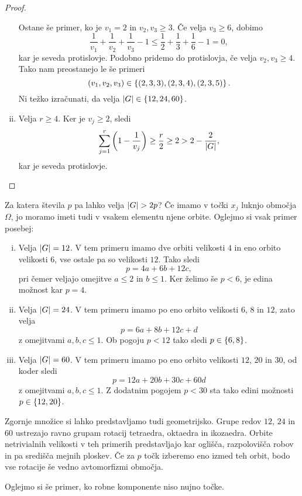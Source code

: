 \begin{proof}
\begin{enumerate}[i)]
Ostane še primer, ko je $v_1 = 2$ in $v_2, v_3 \geq 3$. Če velja
$v_3 \geq 6$, dobimo
\[
\frac{1}{v_1} + \frac{1}{v_2} + \frac{1}{v_3} - 1 \leq
\frac{1}{2} + \frac{1}{3} + \frac{1}{6} - 1 = 0,
\]
kar je seveda protislovje. Podobno pridemo do protislovja, če velja
$v_2, v_3 \geq 4$. Tako nam preostanejo le še primeri
\[
(v_1, v_2, v_3) \in \left\{(2,3,3), (2,3,4), (2,3,5)\right\}.
\]
Ni težko izračunati, da velja $\left\lvert G\right\rvert \in \left\{12, 24, 60\right\}$.

\item Velja $r \geq 4$. Ker je $v_j \geq 2$, sledi
\[
\sum_{j=1}^r \left(1 - \frac{1}{v_j}\right) \geq
\frac{r}{2} \geq 2 > 2 - \frac{2}{\left\lvert G\right\rvert},
\]
kar je seveda protislovje. \qedhere
\end{enumerate}
\end{proof}

Za katera števila $p$ pa lahko velja $\left\lvert G\right\rvert > 2p$? Če imamo v
točki $x_j$ luknjo območja $\Omega$, jo moramo imeti tudi v vsakem
elementu njene orbite. Oglejmo si vsak primer posebej:

\begin{enumerate}[i)]
\item Velja $\left\lvert G\right\rvert = 12$. V tem primeru imamo dve orbiti
velikosti $4$ in eno orbito velikosti $6$, vse ostale pa so
velikosti $12$. Tako sledi
\[
p = 4a + 6b + 12c,
\]
pri čemer veljajo omejitve $a \leq 2$ in $b \leq 1$. Ker želimo še
$p < 6$, je edina možnost kar $p = 4$.

\item Velja $\left\lvert G\right\rvert = 24$. V tem primeru imamo po eno orbito
velikosti $6$, $8$ in $12$, zato velja
\[
p = 6a + 8b + 12c + d
\]
z omejitvami $a, b, c \leq 1$. Ob pogoju $p < 12$ tako sledi
$p \in \left\{6, 8\right\}$.

\item Velja $\left\lvert G\right\rvert = 60$. V tem primeru imamo po eno orbito
velikosti $12$, $20$ in $30$, od koder sledi
\[
p = 12a + 20b + 30c + 60d
\]
z omejitvami $a, b, c \leq 1$. Z dodatnim pogojem $p < 30$ sta tako
edini možnosti $p \in \left\{12, 20\right\}$.
\end{enumerate}

Zgornje množice si lahko predstavljamo tudi geometrijsko. Grupe
redov $12$, $24$ in $60$ ustrezajo ravno grupam rotacij tetraedra,
oktaedra in ikozaedra. Orbite netrivialnih velikosti v teh primerih
predstavljajo kar oglišča, razpolovišča robov in pa središča mejnih
ploskev. Če za $p$ točk izberemo eno izmed teh orbit, bodo vse
rotacije še vedno avtomorfizmi območja.

Oglejmo si še primer, ko robne komponente niso nujno točke.

